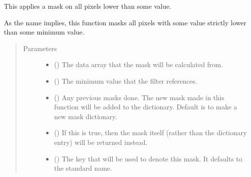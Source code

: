 \documentclass[letterpaper,10pt,english]{sphinxmanual}
\begin{document}
\begin{fulllineitems}
\label{\detokenize{python_docstrings/IfA_Smeargle.echo.masks.masks_echo200:IfA_Smeargle.echo.masks.masks_echo200.echo270_minimum_cut}}
This applies a mask on all pixels lower than some value.

As the name implies, this function masks all pixels with some value
strictly lower than some minimum value.
\begin{quote}\begin{description}
\item[{Parameters}] \leavevmode\begin{itemize}
\item {} 
 () \textendash{} The data array that the mask will be calculated from.

\item {} 
 () \textendash{} The minimum value that the filter references.

\item {} 
 (\sphinxstyleliteralemphasis{\sphinxupquote{ (}}\sphinxstyleliteralemphasis{\sphinxupquote{)}}) \textendash{} Any previous masks done. The new mask made in this function will be
added to the dictionary. Default is to make a new mask dictionary.

\item {} 
 (\sphinxstyleliteralemphasis{\sphinxupquote{ (}}\sphinxstyleliteralemphasis{\sphinxupquote{)}}) \textendash{} If this is true, then the mask itself (rather than the dictionary
entry) will be returned instead.

\item {} 
 (\sphinxstyleliteralemphasis{\sphinxupquote{ (}}\sphinxstyleliteralemphasis{\sphinxupquote{)}}) \textendash{} The key that will be used to denote this mask. It defaults to the
standard name.


\end{itemize}
\end{description}
\end{quote}
\end{fulllineitems}
\end{document}
